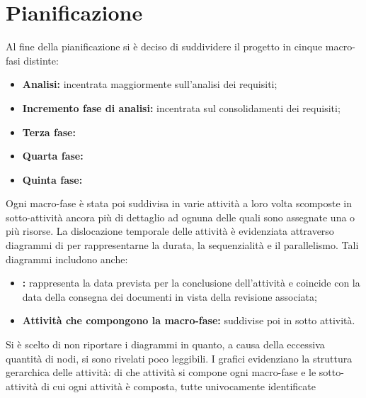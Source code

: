 \section{Pianificazione}

Al fine della pianificazione si è deciso di suddividere il progetto in cinque macro-fasi distinte:
\begin{itemize}
\item \textbf{Analisi:} incentrata maggiormente sull'analisi dei requisiti;
\item \textbf{Incremento fase di analisi:} incentrata sul consolidamenti dei requisiti;
\item \textbf{Terza fase:}
\item \textbf{Quarta fase:}
\item \textbf{Quinta fase:}
\end{itemize}
Ogni macro-fase è stata poi suddivisa in varie attività a loro volta scomposte in sotto-attività ancora più di dettaglio ad ognuna delle quali sono assegnate una o più risorse. La dislocazione temporale delle attività è evidenziata attraverso diagrammi di  per rappresentarne la durata, la sequenzialità e il parallelismo. Tali diagrammi includono anche:
\begin{itemize}
\item \textbf{:} rappresenta la data prevista per la conclusione dell'attività e coincide con la data della consegna dei documenti in vista della revisione associata;
\item \textbf{Attività che compongono la macro-fase:} suddivise poi in sotto attività.
\end{itemize}
Si è scelto di non riportare i diagrammi  in quanto, a causa della eccessiva quantità di nodi, si sono rivelati poco leggibili. I grafici  evidenziano la struttura gerarchica delle attività: di che attività si compone ogni macro-fase e le sotto-attività di cui ogni attività è composta, tutte univocamente identificate 

